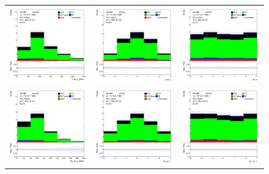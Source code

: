 \begin{figure}[htbp]
  \begin{tabular}{ccc}

    \includegraphics[width=.3\textwidth]{figures/PreFitPlots/lep4_tWZ_4T_OF_LJet_pt.png} &
    \includegraphics[width=.3\textwidth]{figures/PreFitPlots/lep4_tWZ_4T_OF_LJet_eta.png} &
    \includegraphics[width=.3\textwidth]{figures/PreFitPlots/lep4_tWZ_4T_OF_LJet_phi.png} \\
    \includegraphics[width=.3\textwidth]{figures/PreFitPlots/lep4_tWZ_4T_OF_NLJet_pt.png} &
    \includegraphics[width=.3\textwidth]{figures/PreFitPlots/lep4_tWZ_4T_OF_NLJet_eta.png} &
    \includegraphics[width=.3\textwidth]{figures/PreFitPlots/lep4_tWZ_4T_OF_NLJet_phi.png} \\


\end{tabular}
\end{figure}
